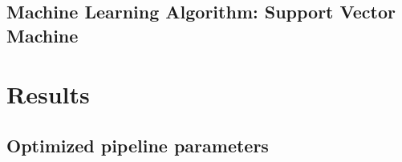 \documentclass{emulateapj}
\begin{document}
\subsection{Machine Learning Algorithm: Support Vector Machine}



\section{Results}
\label{sec:results}
\subsection{Optimized pipeline parameters}\label{sec:gridsearch}
\end{document}
